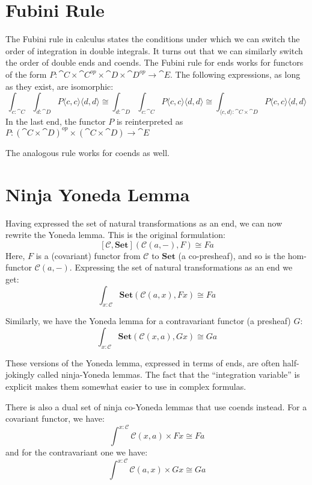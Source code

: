 \documentclass[DaoFP]{subfiles}
\begin{document}
\section{Fubini Rule}

The Fubini rule in calculus states the conditions under which we can switch the order of integration in double integrals. It turns out that we can similarly switch the order of double ends and coends. The Fubini rule for ends works for functors of the form $P \colon \cat C \times \cat C^{op} \times \cat D \times \cat D^{op} \to \cat E$. The following expressions, as long as they exist, are isomorphic:
\[ \int_{c \colon \cat C} \int_{d \colon \cat D} P\langle c, c \rangle \langle d, d \rangle \cong  \int_{d \colon \cat D} \int_{c \colon \cat C} P\langle c, c \rangle \langle d, d \rangle \cong  \int_{\langle c, d \rangle \colon \cat C \times \cat D}  P\langle c, c \rangle \langle d, d \rangle \]
In the last end, the functor $P$ is reinterpreted as $P \colon (\cat C  \times \cat D)^{op} \times (\cat C \times \cat D)\to \cat E$

The analogous rule works for coends as well.

\section{Ninja Yoneda Lemma}

Having expressed the set of natural transformations as an end, we can now rewrite the Yoneda lemma. This is the original formulation:
\[ [\mathcal{C}, \mathbf{Set}]( \mathcal{C}(a, -), F) \cong F a \]
Here, $F$ is a (covariant) functor from $\mathcal{C}$ to $\mathbf{Set}$ (a co-presheaf), and so is the hom-functor $\mathcal{C}(a, -)$. 
Expressing the set of natural transformations as an end we get:
\[ \int_{x \colon \mathcal{C}} \mathbf{Set} (\mathcal{C}(a, x), F x) \cong F a \]

Similarly, we have the Yoneda lemma for a contravariant functor (a presheaf) $G$:
\[ \int_{x \colon \mathcal{C}} \mathbf{Set} (\mathcal{C}(x, a), G x) \cong G a \]

These versions of the Yoneda lemma, expressed in terms of ends, are often half-jokingly called ninja-Yoneda lemmas. The fact that the ``integration variable'' is explicit makes them somewhat easier to use in complex formulas.

There is also a dual set of ninja co-Yoneda lemmas that use coends instead. For a covariant functor, we have:
\[ \int^{x \colon \mathcal{C}} \mathcal{C}(x, a) \times F x \cong F a \]
and for the contravariant one we have:
\[ \int^{x \colon \mathcal{C}} \mathcal{C}(a, x) \times G x \cong G a \]
\end{document}
